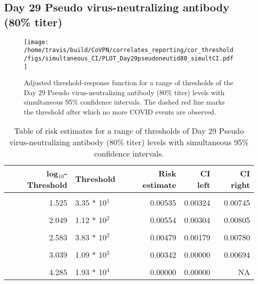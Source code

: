 \documentclass[]{book}
\theoremstyle{definition}
\theoremstyle{definition}
\theoremstyle{definition}
\newcommand{\1}{\mathbbm{1}}
\begin{document}
\clearpage

\clearpage

\clearpage

\hypertarget{day-29-pseudo-virus-neutralizing-antibody-80-titer-2}{%
\subsection{Day 29 Pseudo virus-neutralizing antibody (80\% titer)}\label{day-29-pseudo-virus-neutralizing-antibody-80-titer-2}}

\begin{figure}[H]
\centering
\texttt{[image: /home/travis/build/CoVPN/correlates\_reporting/cor\_threshold/figs/simultaneous\_CI/PLOT\_Day29pseudoneutid80\_simultCI.pdf]}
\caption{Adjusted threshold-response function for a range of thresholds of the
  Day 29 Pseudo virus-neutralizing antibody (80\% titer) levels with simultaneous 95\% confidence intervals. The dashed red line marks the threshold after which no more COVID events are observed. }
\end{figure}
\begin{table}[!h]

\caption{\label{tab:unnamed-chunk-393}Table of risk estimates for a range of thresholds of Day 29 Pseudo virus-neutralizing antibody (80\% titer) levels with simultaneous 95\% confidence intervals.}
\centering
\begin{tabular}[t]{rlrrr}
\toprule
log$_{10}$-Threshold & Threshold & Risk estimate & CI left & CI right\\
\midrule
\cellcolor{gray!6}{0.699} & \cellcolor{gray!6}{5.00 * 10$^0$} & \cellcolor{gray!6}{0.00585} & \cellcolor{gray!6}{0.00382} & \cellcolor{gray!6}{0.00788}\\
1.525 & 3.35 * 10$^1$ & 0.00535 & 0.00324 & 0.00745\\
\cellcolor{gray!6}{1.840} & \cellcolor{gray!6}{6.92 * 10$^1$} & \cellcolor{gray!6}{0.00580} & \cellcolor{gray!6}{0.00341} & \cellcolor{gray!6}{0.00819}\\
2.049 & 1.12 * 10$^2$ & 0.00554 & 0.00304 & 0.00805\\
\cellcolor{gray!6}{2.276} & \cellcolor{gray!6}{1.89 * 10$^2$} & \cellcolor{gray!6}{0.00542} & \cellcolor{gray!6}{0.00269} & \cellcolor{gray!6}{0.00814}\\
2.583 & 3.83 * 10$^2$ & 0.00479 & 0.00179 & 0.00780\\
\cellcolor{gray!6}{2.785} & \cellcolor{gray!6}{6.10 * 10$^2$} & \cellcolor{gray!6}{0.00559} & \cellcolor{gray!6}{0.00172} & \cellcolor{gray!6}{0.00945}\\
3.039 & 1.09 * 10$^3$ & 0.00342 & 0.00000 & 0.00694\\
\cellcolor{gray!6}{3.351} & \cellcolor{gray!6}{2.24 * 10$^3$} & \cellcolor{gray!6}{0.00161} & \cellcolor{gray!6}{0.00000} & \cellcolor{gray!6}{0.00499}\\
4.285 & 1.93 * 10$^4$ & 0.00000 & 0.00000 & NA\\
\bottomrule
\end{tabular}
\end{table}
\end{document}
